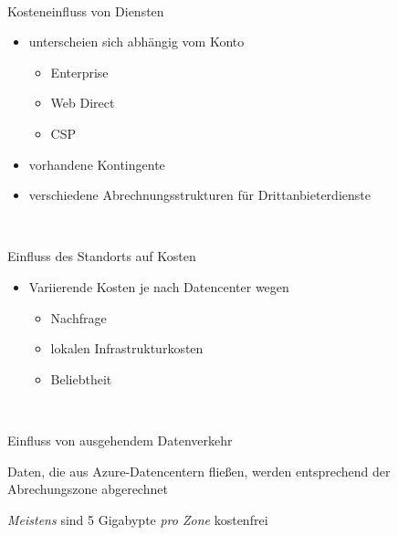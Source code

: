 \documentclass{scrartcl}
\newenvironment{flashcard}[2][]{%
    #1
    \vfill
    \centerline{\Large{#2}}
    \vfill
\newpage
}
{\newpage}
\begin{document}
    \begin{flashcard}[\ ]{Kosteneinfluss von Diensten}
        \begin{itemize}
            \item unterscheien sich abhängig vom Konto
            \begin{itemize}
                \item Enterprise
                \item Web Direct
                \item CSP
            \end{itemize}
            \item vorhandene Kontingente
            \item verschiedene Abrechnungsstrukturen für Drittanbieterdienste
        \end{itemize}
    \end{flashcard}

    \begin{flashcard}[\ ]{Einfluss des Standorts auf Kosten}
        \begin{itemize}
            \item Variierende Kosten je nach Datencenter wegen
            \begin{itemize}
                \item Nachfrage
                \item lokalen Infrastrukturkosten
                \item Beliebtheit
            \end{itemize}
        \end{itemize}

    \end{flashcard}

    \begin{flashcard}[\ ]{Einfluss von ausgehendem Datenverkehr}
        Daten, die aus Azure-Datencentern fließen, werden entsprechend der Abrechungszone abgerechnet

        \vspace{5mm}
        \emph{Meistens} sind 5 Gigabypte \emph{pro Zone} kostenfrei
    \end{flashcard}
\end{document}
